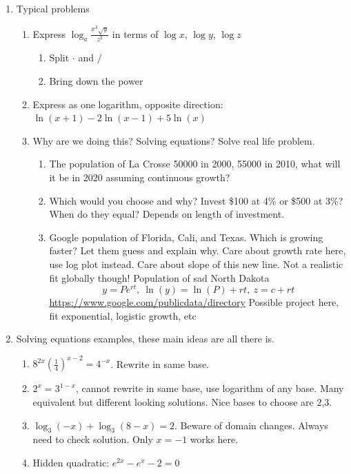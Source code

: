 \documentclass{article}
\newcommand{\ds}{\displaystyle}
\begin{document}
\begin{enumerate}
\item Typical problems
\begin{enumerate}
\item Express $\log_a \frac{x^3\sqrt{y}}{z^2}$ in terms of $\log x$, $\log y $, $\log z$
\begin{enumerate}
\item Split $\cdot$ and $/$
\item Bring down the power
\end{enumerate}
\item Express as one logarithm, opposite direction: $\ds \ln(x+1)-2\ln(x-1)+5\ln(x)$
\item Why are we doing this? Solving equations? Solve real life problem.
\begin{enumerate}
\item The population of La Crosse 50000 in 2000, 55000 in 2010, what will it be in 2020 assuming continuous growth? 
\item Which would you choose and why? Invest \$100 at 4\% or \$500 at 3\%? When do they equal? Depends on length of investment.
\item Google population of Florida, Cali, and Texas. Which is growing faster? Let them guess and explain why. Care about growth rate here, use log plot instead. Care about slope of this new line. Not a realistic fit globally though! Population of sad North Dakota
$$
y = Pe^{rt}, ~ \ln(y) = \ln(P)+rt, ~ z = c + rt
$$
\url{https://www.google.com/publicdata/directory} Possible project here, fit exponential, logistic growth, etc
\end{enumerate}
\end{enumerate}

\item Solving equations examples, these main ideas are all there is.
\begin{enumerate}
\item $8^{2x}(\frac{1}{4})^{x-2} = 4^{-x}$. Rewrite in same base.
\item $2^x = 3^{1-x}$, cannot rewrite in same base, use logarithm of any base. Many equivalent but different looking solutions. Nice bases to choose are 2,3.
\item $\log_3(-x) + \log_3(8-x) = 2$. Beware of domain changes. Always need to check solution. Only $x=-1$ works here.
\item Hidden quadratic: $e^{2x}-e^x-2 = 0$
\end{enumerate}


\end{enumerate}
\end{document}
